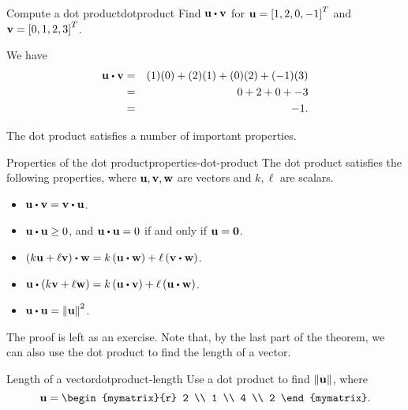 \begin{example}{Compute a dot product}{dotproduct}
  Find $\vect{u} \dotprod \vect{v}$ for $\mbox{\bf u}=\left[1,2,0,-1\right]^T$
  and $\mbox{\bf v}=\left[0,1,2,3\right]^T$.
\end{example}

\begin{solution}
  We have
  \begin{eqnarray*}
    \vect{u} \dotprod \vect{v}
    &=&
        (1)(0) + (2)(1) + (0)(2) + (-1)(3) \\
    &=&
        0 + 2 + 0 + -3 \\
    &=&
        -1.
  \end{eqnarray*}
\end{solution}

The dot product satisfies a number of important properties. 

\begin{theorem}{Properties of the dot product}{properties-dot-product}
  The dot product satisfies the following properties, where
  $\mbox{\bf u},\mbox{\bf v},\mbox{\bf w}$ are vectors and $k,\ell$ are
  scalars.
  \begin{itemize}
  \item $\vect{u}\dotprod\vect{v}=\vect{v}\dotprod\vect{u}$.
  \item $\vect{u}\dotprod\vect{u}\geq 0$, and $\vect{u}\dotprod\vect{u}=0$ if and only if $\mbox{\bf u}=\mbox{\bf 0}$.
  \item $\tup{k\vect{u}+\ell\vect{v}}\dotprod\vect{w}=k\tup{\vect{u}\dotprod\vect{w}}+\ell\tup{\vect{v}\dotprod\vect{w}}$.
  \item $\vect{u}\dotprod\tup{k\vect{v}+\ell\vect{w}}
    =k\tup{\vect{u}\dotprod \vect{v}}+\ell\tup{\vect{u}\dotprod\vect{w}}$.
  \item $\vect{u}\dotprod\vect{u}=\norm{\vect{u}}^{2}$.
  \end{itemize}
\end{theorem}

The proof is left as an exercise. Note that, by the last part of the
theorem, we can also use the dot product to find the length of a
vector.

\begin{example}{Length of a vector}{dotproduct-length}
  Use a dot product to find $\left\|\mbox{\bf u}\right\|$, where
  \begin{equation*}
    \vect{u}
    =
    \begin{mymatrix}{r}
      2 \\
      1 \\
      4 \\
      2
    \end{mymatrix}.
  \end{equation*}
\end{example}

